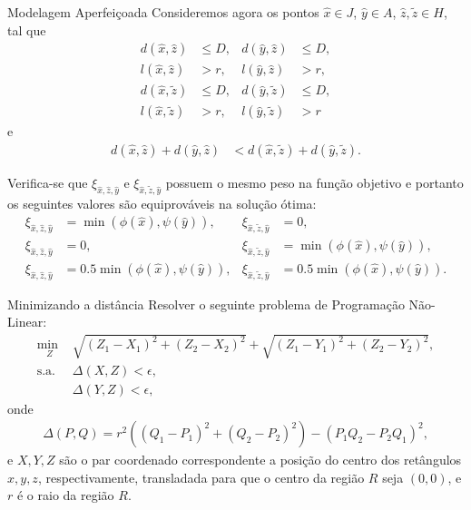 \documentclass[11pt]{beamer}
\begin{document}
\begin{frame}{Modelagem Aperfeiçoada}
    Consideremos agora os pontos $\hat{x} \in J$, $\hat{y} \in A$, $\hat{z},
    \tilde{z} \in H$, tal que
    \begin{align*}
        d(\hat{x}, \hat{z}) &\leq D, & d(\hat{y}, \hat{z}) &\leq D, \\
        l(\hat{x}, \hat{z}) &> r, & l(\hat{y}, \hat{z}) &> r, \\
        d(\hat{x}, \tilde{z}) &\leq D, & d(\hat{y}, \tilde{z}) &\leq D, \\
        l(\hat{x}, \tilde{z}) &> r, & l(\hat{y}, \tilde{z}) &> r
    \end{align*}
    e
    \begin{align*}
        d(\hat{x}, \hat{z}) + d(\hat{y}, \hat{z}) &< d(\hat{x}, \tilde{z}) +
        d(\hat{y}, \tilde{z}).
    \end{align*}

    \pause
    Verifica-se que
    $\xi_{\hat{x},\hat{z},\hat{y}}$ e $\xi_{\hat{x},\tilde{z},\hat{y}}$
    possuem o mesmo peso na fun\c{c}\~{a}o objetivo e portanto os seguintes valores
    s\~{a}o equiprov\'{a}veis na solu\c{c}\~{a}o \'{o}tima:
    \begin{align*}
        \xi_{\hat{x},\hat{z},\hat{y}} &= \min(\phi(\hat{x}), \psi(\hat{y})), &
        \xi_{\hat{x},\tilde{z},\hat{y}} &= 0, \\
        \xi_{\hat{x},\hat{z},\hat{y}} &= 0, &
        \xi_{\hat{x},\tilde{z},\hat{y}} &= \min(\phi(\hat{x}), \psi(\hat{y})), \\
        \xi_{\hat{x},\hat{z},\hat{y}} &= 0.5 \min(\phi(\hat{x}), \psi(\hat{y})), &
        \xi_{\hat{x},\tilde{z},\hat{y}} &= 0.5 \min(\phi(\hat{x}), \psi(\hat{y})).
    \end{align*}
\end{frame}

\begin{frame}{Minimizando a distância}
    Resolver o seguinte problema de Programação Não-Linear:
    \begin{align*}
        \underset{Z}{\text{min }} & \sqrt{(Z_1 - X_1)^2 + (Z_2 - X_2)^2} +
        \sqrt{(Z_1 - Y_1)^2 + (Z_2 - Y_2)^2}, \\
        \text{s.a. } & \Delta(X, Z) < \epsilon, \\
        & \Delta(Y, Z) < \epsilon,
    \end{align*}
    onde
    \begin{align*}
        \Delta(P, Q) = r^2 \left( (Q_1 - P_1)^2 + (Q_2 - P_2)^2 \right) - \left(
        P_1 Q_2 - P_2 Q_1 \right)^2,
    \end{align*}
    e $X, Y, Z$ são o par coordenado correspondente a posição do centro dos
    retângulos $x, y, z$, respectivamente, transladada para que o centro da região
    $R$ seja $(0, 0)$, e $r$ é o raio da região $R$.
\end{frame}
\end{document}
